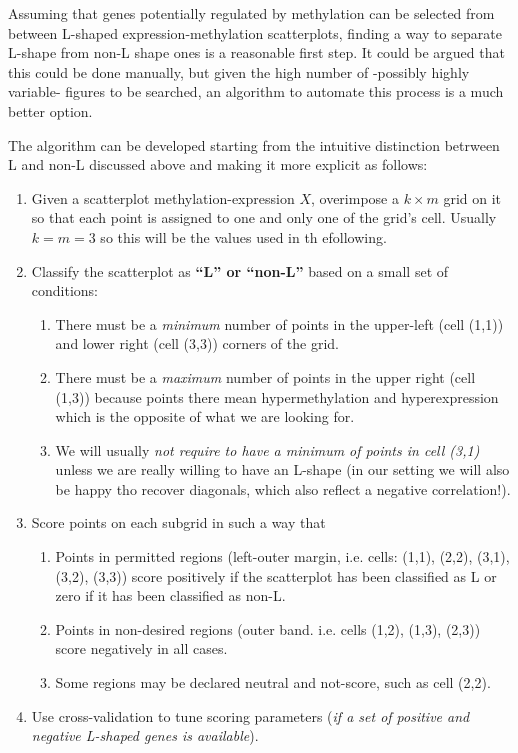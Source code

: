 \documentclass[10pt,letterpaper]{article}
\begin{document}
Assuming that genes potentially regulated by methylation can be selected
from between L-shaped expression-methylation scatterplots, finding a way
to separate L-shape from non-L shape ones is a reasonable first step. It
could be argued that this could be done manually, but given the high
number of -possibly highly variable- figures to be searched, an
algorithm to automate this process is a much better option.

The algorithm can be developed starting from the intuitive distinction
betrween L and non-L discussed above and making it more explicit as
follows:

\begin{enumerate}
\item Given a scatterplot methylation-expression $X$, overimpose a $k\times m$ grid on it so that each point is assigned to one and only one of the grid's cell. Usually $k=m=3$ so this will be the values used in th efollowing.
\item Classify the scatterplot as \textbf{``L'' or ``non-L''} based on a small set of conditions:
\begin{enumerate}
  \item There must be a \emph{minimum} number of points in the upper-left (cell (1,1)) and lower right (cell (3,3)) corners of the grid.
  \item There must be a \emph{maximum} number of points in the upper right (cell (1,3)) because points there mean hypermethylation and hyperexpression which is the opposite of what we are looking for.
  \item We will usually \emph{not require to have a minimum of points in cell (3,1)} unless we are really willing to have an L-shape (in our setting we will also be happy tho recover diagonals, which also reflect a negative correlation!).
\end{enumerate}
\item Score points on each subgrid in such a way that
\begin{enumerate}
    \item Points in permitted regions (left-outer margin, i.e. cells: (1,1), (2,2), (3,1), (3,2), (3,3)) score positively if the scatterplot has been classified as L or zero if it has been classified as non-L.
    \item Points in non-desired regions (outer band. i.e. cells (1,2), (1,3), (2,3)) score negatively in all cases.
    \item Some regions may be declared neutral and not-score, such as cell (2,2).
\end{enumerate}
\item Use cross-validation to tune scoring parameters (\textit{if a set of positive and negative L-shaped genes is available}). 
\end{enumerate}
\end{document}
